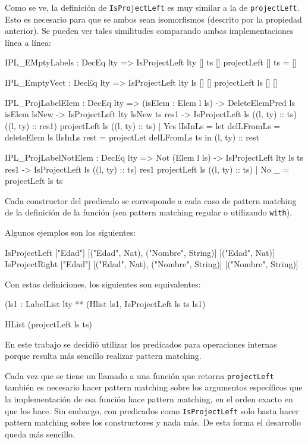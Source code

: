 Como se ve, la definición de \texttt{IsProjectLeft} es muy similar a la de \texttt{projectLeft}. Esto es necesario para que se ambos sean isomorfismos (descrito por la propiedad anterior). Se pueden ver tales similitudes comparando ambas implementaciones línea a línea:

\begin{code}
IPL_EMptyLabels : DecEq lty => IsProjectLeft {lty} [] ts []
projectLeft [] ts = []

IPL_EmptyVect : DecEq lty => IsProjectLeft {lty} ls [] []
projectLeft ls [] []

IPL_ProjLabelElem : DecEq lty => (isElem : Elem l ls) ->
  DeleteElemPred ls isElem lsNew ->
  IsProjectLeft {lty} lsNew ts res1 ->
  IsProjectLeft ls ((l, ty) :: ts) ((l, ty) :: res1)
projectLeft ls ((l, ty) :: ts) | Yes lIsInLs =
  let delLFromLs = deleteElem ls lIsInLs
    rest = projectLet delLFromLs ts
  in (l, ty) :: rest

IPL_ProjLabelNotElem : DecEq lty => Not (Elem l ls) ->
  IsProjectLeft {lty} ls ts res1 ->
  IsProjectLeft ls ((l, ty) :: ts) res1
projectLeft ls ((l, ty) :: ts) | No _ = projectLeft ls ts
\end{code}

Cada constructor del predicado se corresponde a cada caso de pattern matching de la definición de la función (sea pattern matching regular o utilizando \texttt{with}).

Algunos ejemplos son los siguientes:

\begin{code}
IsProjectLeft ["Edad"] [("Edad", Nat), ("Nombre", String)]
  [("Edad", Nat)]
IsProjectRight ["Edad"] [("Edad", Nat), ("Nombre", String)]
  [("Nombre", String)]
\end{code}

Con estas definiciones, los siguientes son equivalentes:

\begin{code}
(ls1 : LabelList lty ** (Hlist ls1, IsProjectLeft ls ts ls1)

HList (projectLeft ls ts)
\end{code}

En este trabajo se decidió utilizar los predicados para operaciones internas porque resulta más sencillo realizar pattern matching.

Cada vez que se tiene un llamado a una función que retorna \texttt{projectLeft} también es necesario hacer pattern matching sobre los argumentos específicos que la implementación de esa función hace pattern matching, en el orden exacto en que los hace. Sin embargo, con predicados como \texttt{IsProjectLeft} solo basta hacer pattern matching sobre los constructores y nada más. De esta forma el desarrollo queda más sencillo.

